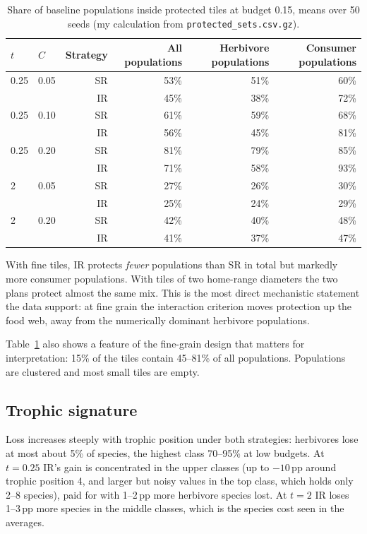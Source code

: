 \documentclass[11pt,a4paper]{article}
\newcommand{\code}[1]{\texttt{\small #1}}
\newcommand{\pp}{\,pp}
\begin{document}
\begin{table}[H]
\centering
\caption{Share of baseline populations inside protected tiles at budget 0.15, means over 50 seeds (my
calculation from \code{protected\_sets.csv.gz}).}\label{tab:pops}
\small
\begin{tabular}{@{}llrrrr@{}}
\toprule
$t$ & $C$ & Strategy & All populations & Herbivore populations & Consumer populations \\
\midrule
0.25 & 0.05 & SR & 53\% & 51\% & 60\% \\
     &      & IR & 45\% & 38\% & 72\% \\
0.25 & 0.10 & SR & 61\% & 59\% & 68\% \\
     &      & IR & 56\% & 45\% & 81\% \\
0.25 & 0.20 & SR & 81\% & 79\% & 85\% \\
     &      & IR & 71\% & 58\% & 93\% \\
\midrule
2 & 0.05 & SR & 27\% & 26\% & 30\% \\
  &      & IR & 25\% & 24\% & 29\% \\
2 & 0.20 & SR & 42\% & 40\% & 48\% \\
  &      & IR & 41\% & 37\% & 47\% \\
\bottomrule
\end{tabular}
\end{table}

With fine tiles, IR protects \emph{fewer} populations than SR in total but markedly more consumer
populations. With tiles of two home-range diameters the two plans protect almost the same mix. This is the
most direct mechanistic statement the data support: at fine grain the interaction criterion moves
protection up the food web, away from the numerically dominant herbivore populations.

Table~\ref{tab:pops} also shows a feature of the fine-grain design that matters for interpretation: 15\% of
the tiles contain 45--81\% of all populations. Populations are clustered and most small tiles are empty.

\subsection{Trophic signature}
Loss increases steeply with trophic position under both strategies: herbivores lose at most about 5\% of
species, the highest class 70--95\% at low budgets. At $t=0.25$ IR's gain is concentrated in the upper
classes (up to $-10$\pp{} around trophic position 4, and larger but noisy values in the top class, which
holds only 2--8 species), paid for with 1--2\pp{} more herbivore species lost. At $t=2$ IR loses 1--3\pp{}
more species in the middle classes, which is the species cost seen in the averages.
\end{document}
